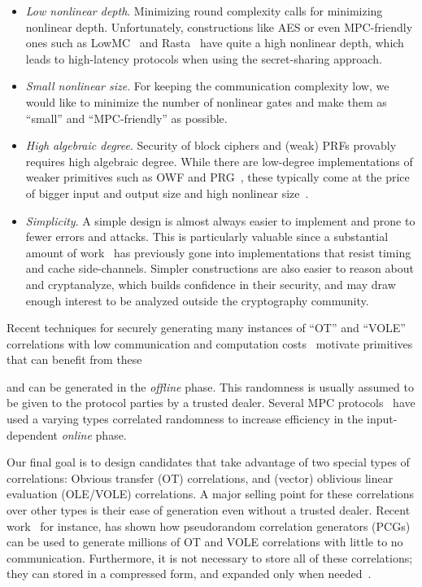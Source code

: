 \begin{itemize}[itemsep=1ex]
    \item \textit{Low nonlinear depth}. Minimizing round complexity calls for minimizing nonlinear depth. Unfortunately, constructions like AES or even MPC-friendly ones such as LowMC~\cite{cite} and Rasta~\cite{cite} have quite a high nonlinear depth, which leads to high-latency protocols when using the secret-sharing approach.
    
\item \textit{Small nonlinear size}.
 For keeping the communication complexity low, we would like to minimize the number of nonlinear gates and make them as ``small'' and ``MPC-friendly'' as possible. 

\item \textit{High algebraic degree}.
Security of block ciphers and (weak) PRFs provably requires high algebraic degree. While there are low-degree implementations of weaker primitives such as OWF and PRG~\cite{MQref,Goldreich,AIK05}, these typically come at the price of bigger input and output size and high nonlinear size~\cite{AsiacryptCouteau}.
    
    \item \textit{Simplicity}.  A simple design is almost always easier to implement and prone to fewer errors and attacks. This is particularly valuable since a substantial amount of work~\cite{?} has previously gone into implementations that resist timing and cache side-channels. Simpler constructions are also easier to reason about and cryptanalyze, which builds confidence in their security, and may draw enough interest to be analyzed outside the cryptography community.
\end{itemize}

\iffalse     
    Recent techniques for securely generating many instances of ``OT'' and ``VOLE'' correlations  with low communication and computation costs~\cite{BCGI18,BCGKIS19,more} motivate primitives that can benefit from these
    
    and can be generated in the \textit{offline} phase. This randomness is usually assumed to be given to the protocol parties by a trusted dealer. Several MPC protocols~\cite{?} have used a varying types correlated randomness to increase efficiency in the input-dependent \textit{online} phase.

    \hspace*{1em} Our final goal is to design candidates that take advantage of two special types of correlations: Obvious transfer (OT) correlations, and (vector) oblivious linear evaluation (OLE/VOLE) correlations. A major selling point for these correlations over other types is their ease of generation even without a trusted dealer. Recent work~\cite{?} for instance, has shown how pseudorandom correlation generators (PCGs) can be used to generate millions of OT and VOLE correlations with little to no communication. Furthermore, it is not necessary to store all of these correlations; they can stored in a compressed form, and expanded only when needed~\cite{?}.


